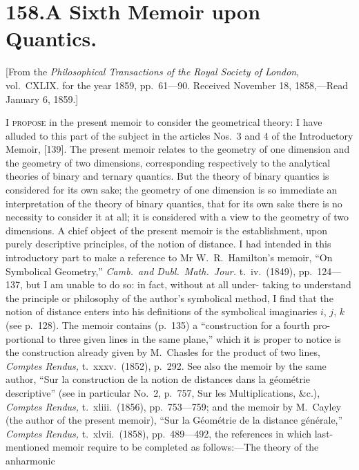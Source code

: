 \documentclass[11pt,a4paper]{article}
\begin{document}
\section*{158.\quad A Sixth Memoir upon Quantics.}

\begin{flushleft}
\small
[From the \textit{Philosophical Transactions of the Royal Society of London}, vol.~CXLIX.
for the year 1859, pp.~61---90. Received November 18, 1858,---Read January 6, 1859.]
\end{flushleft}

I \textsc{propose} in the present memoir to consider the geometrical theory: I have
alluded to this part of the subject in the articles Nos.~3 and 4 of the Introductory
Memoir, [139]. The present memoir relates to the geometry of one dimension and the
geometry of two dimensions, corresponding respectively to the analytical theories of
binary and ternary quantics. But the theory of binary quantics is considered for its
own sake; the geometry of one dimension is so immediate an interpretation of the
theory of binary quantics, that for its own sake there is no necessity to consider it at
all; it is considered with a view to the geometry of two dimensions. A chief object
of the present memoir is the establishment, upon purely descriptive principles, of the
notion of distance. I had intended in this introductory part to make a reference to
Mr W.~R.~Hamilton's memoir, ``On Symbolical Geometry,'' \textit{Camb.~and Dubl.~Math.~Jour.}
t.~iv.~(1849), pp.~124---137, but I am unable to do so: in fact, without at all under-
taking to understand the principle or philosophy of the author's symbolical method, I
find that the notion of distance enters into his definitions of the symbolical imaginaries
$i$, $j$, $k$ (see p.~128). The memoir contains (p.~135) a ``construction for a fourth pro-
portional to three given lines in the same plane,'' which it is proper to notice is the
construction already given by M.~Chasles for the product of two lines, \textit{Comptes Rendus,}
t.~xxxv.\ (1852), p.~292. See also the memoir by the same author, ``Sur la construction
de la notion de distances dans la g\'{e}om\'{e}trie descriptive'' (see in particular No.~2, p.~757,
Sur les Multiplications, \&c.), \textit{Comptes Rendus,} t.~xliii.\ (1856), pp.~753---759; and the memoir
by M.~Cayley (the author of the present memoir), ``Sur la G\'{e}om\'{e}trie de la distance
g\'{e}n\'{e}rale,'' \textit{Comptes Rendus,} t.~xlvii.\ (1858), pp.~489---492, the references in which last-
mentioned memoir require to be completed as follows:---The theory of the anharmonic
\end{document}
